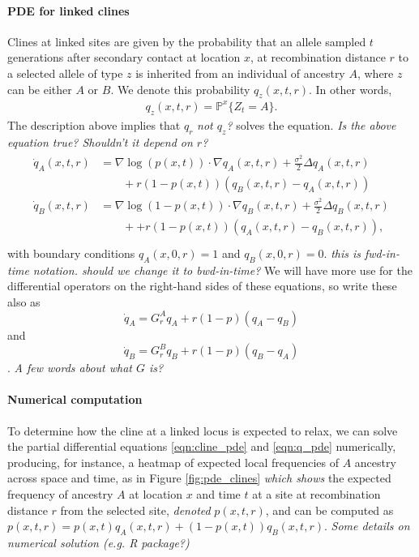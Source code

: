 \documentclass[12pt]{article}
\newcommand{\alisa}[1]{{\em \color{red} #1}}
\renewcommand{\P}{\mathbb{P}}
\newcommand{\grad}{\nabla}
\begin{document}
\paragraph{PDE for linked clines}
Clines at linked sites are given by
the probability that 
an allele sampled $t$ generations after secondary contact at location $x$,
at recombination distance $r$ to a selected allele of type $z$
is inherited from an individual of ancestry $A$,
where $z$ can be either $A$ or $B$.
We denote this probability $q_z(x,t,r)$.
In other words,
\begin{align}
    q_z(x,t,r) = \P^x \{Z_t = A\} .
\end{align}
The description above implies that $q_r$ \alisa{not $q_z$?} solves the equation. \alisa{Is the above equation true? Shouldn't it depend on $r$?}
\begin{align}
    \begin{aligned}  \label{eqn:q_pde}
    \dot q_A(x,t,r) 
            &= \grad \log(p(x,t)) \cdot \grad q_A(x,t,r) 
                + \frac{\sigma^2}{2} \Delta q_A(x,t,r) 
            \\ &\qquad {} + 
                r (1-p(x,t))(q_B(x,t,r)-q_A(x,t,r))  \\
    \dot q_B(x,t,r) &= \grad \log(1-p(x,t)) \cdot \grad q_B(x,t,r) 
            + \frac{\sigma^2}{2} \Delta q_B(x,t,r)
            \\ &\qquad {} + 
            + r (1-p(x,t))(q_A(x,t,r)-q_B(x,t,r))  ,
    \end{aligned} \\
\end{align}
with boundary conditions $q_A(x,0,r)=1$ and $q_B(x,0,r)=0$. \alisa{this is fwd-in-time notation. should we change it to bwd-in-time?}
We will have more use for the differential operators on the right-hand sides of these equations,
so write these also as 
$$\dot q_A = G_r^A q_A + r (1-p) (q_A-q_B)$$
and 
$$\dot q_B = G_r^B q_B + r (1-p) (q_B-q_A)$$.
\alisa{A few words about what $G$ is?}


\paragraph{Numerical computation}
To determine how the cline at a linked locus is expected to relax,
we can solve the partial differential equations \eqref{eqn:cline_pde} and \eqref{eqn:q_pde} numerically,
producing, for instance, a heatmap of expected local frequencies of $A$ ancestry
across space and time, as in Figure \ref{fig:pde_clines} \alisa{which shows}
 the expected frequency of ancestry $A$ at location $x$ and time $t$ at a site at recombination distance $r$ from the selected site,
\alisa{denoted} $p(x,t,r)$, and can be computed as $p(x,t,r) = p(x,t) q_A(x,t,r) + (1-p(x,t)) q_B(x,t,r)$. \alisa{Some details on numerical solution (e.g. R package?)}
\end{document}
